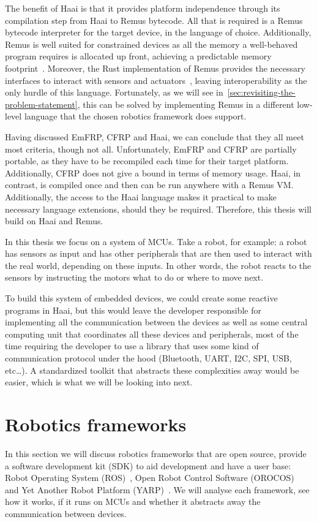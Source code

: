 \documentclass[a4paper]{book}
\begin{document}
The benefit of Haai is that it provides platform independence through its
compilation step from Haai to Remus bytecode. All that is required is a Remus
bytecode interpreter for the target device, in the language of choice.
Additionally, Remus is well suited for constrained devices as all the memory a
well-behaved program requires is allocated up front, achieving a predictable
memory footprint~\cite{oeyen2024virtual}. Moreover, the Rust implementation of
Remus provides the necessary interfaces to interact with sensors and
actuators~\cite{descheemaeker2023compilation}, leaving interoperability as the
only hurdle of this language. Fortunately, as we will see
in~\cref{sec:revisiting-the-problem-statement}, this can be solved by
implementing Remus in a different low-level language that the chosen robotics
framework does support.

Having discussed EmFRP, CFRP and Haai, we can conclude that they all meet most
criteria, though not all. Unfortunately, EmFRP and CFRP are partially portable,
as they have to be recompiled each time for their target platform. Additionally,
CFRP does not give a bound in terms of memory usage. Haai, in contrast, is
compiled once and then can be run anywhere with a Remus VM. Additionally, the
access to the Haai language makes it practical to make necessary language
extensions, should they be required. Therefore, this thesis will build on Haai
and Remus.
\par
In this thesis we focus on a system of MCUs. Take a robot, for example: a robot
has sensors as input and has other peripherals that are then used to interact
with the real world, depending on these inputs. In other words, the robot reacts
to the sensors by instructing the motors what to do or where to move next.
\par
To build this system of embedded devices, we could create some reactive programs
in Haai, but this would leave the developer responsible for implementing all the
communication between the devices as well as some central computing unit that
coordinates all these devices and peripherals, most of the time requiring the
developer to use a library that uses some kind of communication protocol under
the hood (Bluetooth, UART, I2C, SPI, USB, etc\dots). A standardized toolkit that
abstracts these complexities away would be easier, which is what we will be
looking into next.
\section{Robotics frameworks}
\label{sec:robotics-frameworks}
In this section we will discuss robotics frameworks that are open source,
provide a software development kit (SDK) to aid development and have a user
base: Robot Operating System (ROS)~\cite{quigley2009ros, macenski2022robot,
allaban2021developing, belsare2023microros}, Open Robot Control Software
(OROCOS)~\cite{bruyninckx2001open} and Yet Another Robot Platform
(YARP)~\cite{metta2006yarp}. We will analyse each framework, see how it works,
if it runs on MCUs and whether it abstracts away the communication between
devices.
\end{document}
